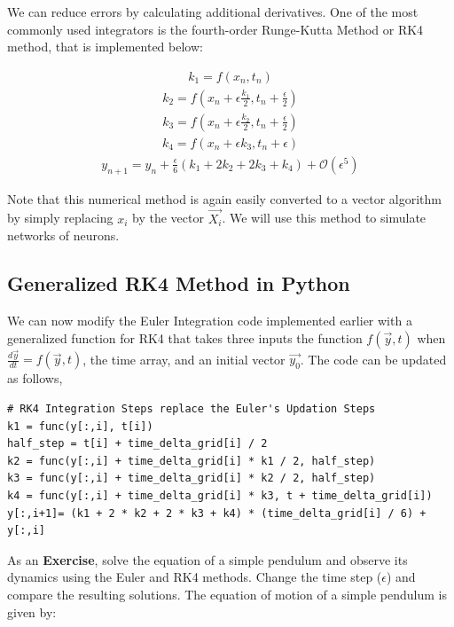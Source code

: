 \documentclass[10pt,letterpaper]{article}
\begin{document}
\begin{nolinenumbers}
We can reduce errors by calculating additional derivatives. One of the most commonly used integrators is the fourth-order Runge-Kutta Method or RK4 method, that is implemented below:

\begin{eqnarray}k_1=f(x_n,t_n)\end{eqnarray}
\begin{eqnarray}k_2=f(x_n+\epsilon\frac{k_1}{2},t_n+\frac{\epsilon}{2})\end{eqnarray}
\begin{eqnarray}k_3=f(x_n+\epsilon\frac{k_2}{2},t_n+\frac{\epsilon}{2})\end{eqnarray}
\begin{eqnarray}k_4=f(x_n+\epsilon k_3,t_n+\epsilon)\end{eqnarray}
\begin{eqnarray}y_{n+1}=y_n+\frac{\epsilon}{6}(k_1+2 k_2+2 k_3+k_4)+\mathcal{O}(\epsilon^5)\end{eqnarray}

Note that this numerical method is again easily converted to a vector algorithm by simply replacing $x_i$ by the vector $\vec{X_i}$. We will use this method to simulate networks of neurons.

\subsection*{Generalized RK4 Method in Python}

We can now modify the Euler Integration code implemented earlier with a generalized function for RK4 that takes three inputs \textemdash the function $f(\vec{y},t)$ when $\frac{d\vec{y}}{dt}=f(\vec{y},t)$, the time array, and an initial vector $\vec{y_0}$. The code can be updated as follows,

\begin{verbatim}
# RK4 Integration Steps replace the Euler's Updation Steps
k1 = func(y[:,i], t[i])                               
half_step = t[i] + time_delta_grid[i] / 2
k2 = func(y[:,i] + time_delta_grid[i] * k1 / 2, half_step)
k3 = func(y[:,i] + time_delta_grid[i] * k2 / 2, half_step)
k4 = func(y[:,i] + time_delta_grid[i] * k3, t + time_delta_grid[i])
y[:,i+1]= (k1 + 2 * k2 + 2 * k3 + k4) * (time_delta_grid[i] / 6) + y[:,i]
\end{verbatim}

As an \textbf{Exercise}, solve the equation of a simple pendulum and observe its dynamics using the Euler and RK4 methods. Change the time step ($\epsilon$) and compare the resulting solutions. The equation of motion of a simple pendulum is given by: 


\end{nolinenumbers}
\end{document}
